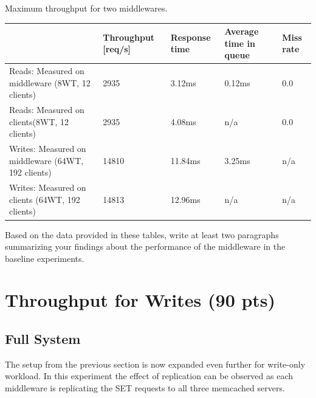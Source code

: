\documentclass[11pt,a4paper]{article}
\begin{document}
\begin{center}
	{Maximum throughput for two middlewares.}
	\begin{tabular}{|l|p{2cm}|p{2cm}|p{2cm}|p{2cm}|}
		\hline                                                    & Throughput [req/s]    & Response time & Average time in queue & Miss rate \\ 
		\hline Reads: Measured on middleware (8WT, 12 clients)    &    2935        &   3.12ms      &   0.12ms              & 0.0       \\ 
		\hline Reads: Measured on clients(8WT, 12 clients)        &    2935        &   4.08ms      & n/a                   & 0.0       \\ 
		\hline Writes: Measured on middleware (64WT, 192 clients) &    14810       &   11.84ms     &   3.25ms              & n/a       \\ 
		\hline Writes: Measured on clients (64WT, 192 clients)    &    14813       &   12.96ms     & n/a                   & n/a       \\ 
		\hline 
	\end{tabular}
\end{center}

Based on the data provided in these tables, write at least two paragraphs summarizing your findings about the performance of the middleware in the baseline experiments.

\section{Throughput for Writes (90 pts)}

\subsection{Full System} \label{sec4}
The setup from the previous section is now expanded even further for write-only workload. In this experiment the effect of replication can be observed as each middleware is replicating the SET requests to all three memcached servers.
\end{document}
